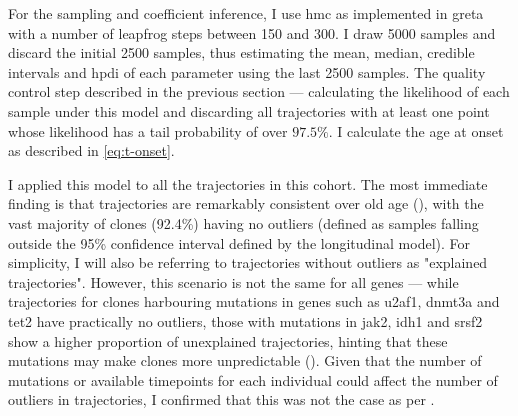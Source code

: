 For the sampling and coefficient inference, I use \ac{hmc} as implemented in greta \cite{Golding2018-zp} with a number of leapfrog steps between 150 and 300. I draw 5000 samples and discard the initial 2500 samples, thus estimating the mean, median, credible intervals and \ac{hpdi} of each parameter using the last 2500 samples. The quality control step described in the previous section --- calculating the likelihood of each sample under this model and discarding all trajectories with at least one point whose likelihood has a tail probability of over $97.5\%$. I calculate the age at onset as described in \eqref{eq:t-onset}.

I applied this model to all the trajectories in this cohort. The most immediate finding is that trajectories are remarkably consistent over old age (), with the vast majority of clones (92.4\%) having no outliers (defined as samples falling outside the 95\% confidence interval defined by the longitudinal model). For simplicity, I will also be referring to trajectories without outliers as "explained trajectories". However, this scenario is not the same for all genes --- while trajectories for clones harbouring mutations in genes such as \ac{u2af1}, \ac{dnmt3a} and \ac{tet2} have practically no outliers, those with mutations in \ac{jak2}, \ac{idh1} and \ac{srsf2} show a higher proportion of unexplained trajectories, hinting that these mutations may make clones more unpredictable (). Given that the number of mutations or available timepoints for each individual could affect the number of outliers in trajectories, I confirmed that this was not the case as per . 

\begin{figure}[!ht]
	\label{fig:ch-trajectories-examples}
\end{figure}

\begin{figure}[!ht]
	\label{fig:ch-trajectories-explained-gene}
\end{figure}

